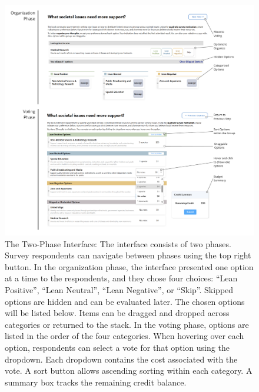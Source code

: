 \begin{figure}[ht]
    \centering
    \includegraphics[width=1\textwidth]{content/image/detailed.pdf}
    \caption{The Two-Phase Interface: The interface consists of two phases. Survey respondents can navigate between phases using the top right button. In the organization phase, the interface presented one option at a time to the respondents, and they chose four choices: ``Lean Positive'', ``Lean Neutral'', ``Lean Negative'', or ``Skip''. Skipped options are hidden and can be evaluated later. The chosen options will be listed below. Items can be dragged and dropped across categories or returned to the stack. In the voting phase, options are listed in the order of the four categories. When hovering over each option, respondents can select a vote for that option using the dropdown. Each dropdown contains the cost associated with the vote. A sort button allows ascending sorting within each category. A summary box tracks the remaining credit balance.}
    \label{fig:interactiveInterface}
\end{figure}
